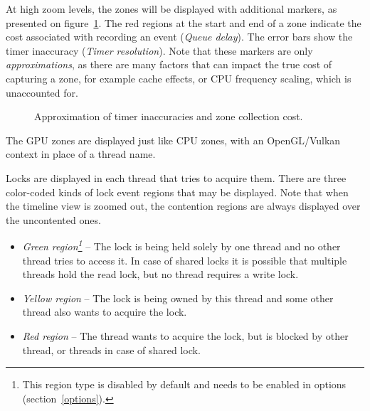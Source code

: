 \documentclass[hidelinks,titlepage,a4paper]{article}
\begin{document}
At high zoom levels, the zones will be displayed with additional markers, as presented on figure~\ref{inaccuracy}. The red regions at the start and end of a zone indicate the cost associated with recording an event (\emph{Queue delay}). The error bars show the timer inaccuracy (\emph{Timer resolution}). Note that these markers are only \emph{approximations}, as there are many factors that can impact the true cost of capturing a zone, for example cache effects, or CPU frequency scaling, which is unaccounted for.

\begin{figure}[h]
\centering{}
\caption{Approximation of timer inaccuracies and zone collection cost.}
\label{inaccuracy}
\end{figure}

The GPU zones are displayed just like CPU zones, with an OpenGL/Vulkan context in place of a thread name.

Locks are displayed in each thread that tries to acquire them. There are three color-coded kinds of lock event regions that may be displayed. Note that when the timeline view is zoomed out, the contention regions are always displayed over the uncontented ones.

\begin{itemize}
\item \emph{Green region\footnote{This region type is disabled by default and needs to be enabled in options (section~\ref{options}).}} -- The lock is being held solely by one thread and no other thread tries to access it. In case of shared locks it is possible that multiple threads hold the read lock, but no thread requires a write lock.
\item \emph{Yellow region} -- The lock is being owned by this thread and some other thread also wants to acquire the lock.
\item \emph{Red region} -- The thread wants to acquire the lock, but is blocked by other thread, or threads in case of shared lock.
\end{itemize}
\end{document}
